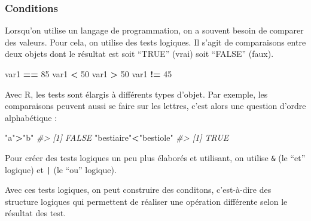 \documentclass[]{article}
\newenvironment{Shaded}{\begin{snugshade}}{\end{snugshade}}
\newcommand{\CommentTok}[1]{\textcolor[rgb]{0.56,0.35,0.01}{\textit{#1}}}
\newcommand{\DecValTok}[1]{\textcolor[rgb]{0.00,0.00,0.81}{#1}}
\newcommand{\NormalTok}[1]{#1}
\newcommand{\OperatorTok}[1]{\textcolor[rgb]{0.81,0.36,0.00}{\textbf{#1}}}
\newcommand{\StringTok}[1]{\textcolor[rgb]{0.31,0.60,0.02}{#1}}
\begin{document}
\hypertarget{conditions}{%
\subsubsection*{Conditions}\label{conditions}}

Lorsqu'on utilise un langage de programmation, on a souvent besoin de comparer
des valeurs. Pour cela, on utilise des tests logiques. Il s'agit de comparaisons
entre deux objets dont le résultat est soit ``TRUE'' (vrai) soit ``FALSE'' (faux).

\begin{Shaded}
\begin{Highlighting}[]
\NormalTok{var1 }\OperatorTok{==}\StringTok{ }\DecValTok{85}
\NormalTok{var1 }\OperatorTok{<}\StringTok{ }\DecValTok{50}
\NormalTok{var1 }\OperatorTok{>}\StringTok{ }\DecValTok{50}
\NormalTok{var1 }\OperatorTok{!=}\StringTok{ }\DecValTok{45}
\end{Highlighting}
\end{Shaded}

Avec R, les tests sont élargis à différents types d'objet. Par exemple, les
comparaisons peuvent aussi se faire sur les lettres, c'est alors une question
d'ordre alphabétique :

\begin{Shaded}
\begin{Highlighting}[]
\StringTok{"a"}\OperatorTok{>}\StringTok{"b"}
\CommentTok{#> [1] FALSE}
\StringTok{"bestiaire"}\OperatorTok{<}\StringTok{"bestiole"}
\CommentTok{#> [1] TRUE}
\end{Highlighting}
\end{Shaded}

Pour créer des tests logiques un peu plus élaborés et utilisant, on utilise \texttt{\&} (le ``et'' logique) et \texttt{|} (le ``ou'' logique).

\begin{Shaded}
\end{Shaded}

Avec ces tests logiques, on peut construire des conditons, c'est-à-dire des structure logiques qui permettent de réaliser une opération différente selon le résultat des test.
\end{document}
